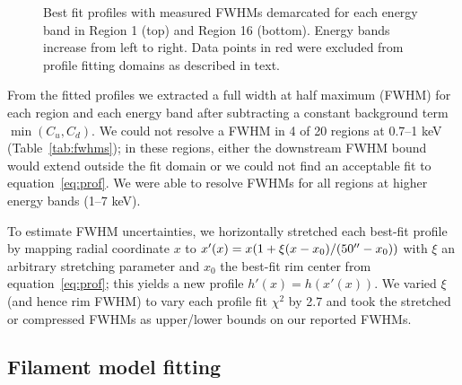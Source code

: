 \documentclass[iop, apj, numberedappendix]{emulateapj}
\begin{document}
\begin{figure*}%
    \caption{Best fit profiles with measured FWHMs demarcated for each energy
        band in Region 1 (top) and Region 16 (bottom).  Energy bands increase
        from left to right.  Data points in red were excluded from profile
        fitting domains as described in text.}
    \label{fig:profiles}
\end{figure*}

From the fitted profiles we extracted a full width at half maximum (FWHM) for
each region and each energy band after subtracting a constant background term
$\min(C_u, C_d)$.  We could not resolve a FWHM in 4 of 20 regions at 0.7--1 keV
(Table~\ref{tab:fwhms}); in these regions, either the downstream FWHM bound
would extend outside the fit domain or we could not find an acceptable fit to
equation~\eqref{eq:prof}.  We were able to resolve FWHMs for all regions at
higher energy bands (1--7 keV).

To estimate FWHM uncertainties, we horizontally stretched each best-fit
profile by mapping radial coordinate $x$ to
$x'(x) = x (1 + \xi (x-x_0)/(50\mbox{$^{\prime\prime}$}-x_0))$ with $\xi$ an arbitrary stretching
parameter and $x_0$ the best-fit rim center from equation~\eqref{eq:prof};
this yields a new profile $h'(x) = h(x'(x))$.
We varied $\xi$ (and hence rim FWHM) to vary each profile fit $\chi^2$ by 2.7
and took the stretched or compressed FWHMs as upper/lower bounds on our
reported FWHMs.

\subsection{Filament model fitting}
\label{sec:fits}
\end{document}

